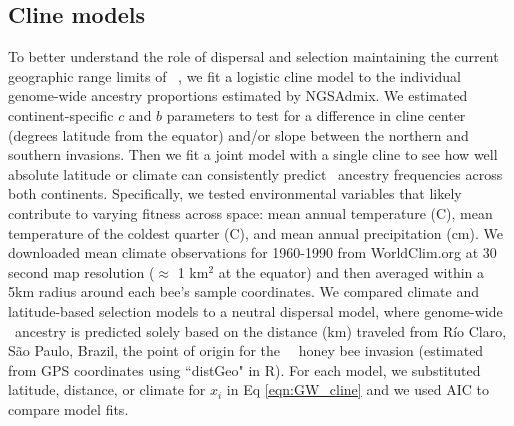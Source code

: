 \subsection*{Cline models}
To better understand the role of dispersal and selection maintaining the current geographic range limits of \scutellata\ \anc, we fit a logistic cline model to the individual genome-wide ancestry proportions estimated by NGSAdmix. We estimated continent-specific $c$ and $b$ parameters to test for a difference in cline center (degrees latitude from the equator) and/or slope between the northern and southern invasions. Then we fit a joint model with a single cline to see how well absolute latitude or climate can consistently predict \A\ ancestry frequencies across both continents. Specifically, we tested  environmental variables that likely contribute to varying fitness across space: mean annual temperature (\degree C), mean temperature of the coldest quarter (\degree C),  and mean annual precipitation (cm). We downloaded mean climate observations for 1960-1990 \cite{Hijmans:2005ke} from WorldClim.org at 30 second map resolution ($\approx$ 1 km$^{2}$ at the equator) and then averaged within a 5km radius around each bee's sample coordinates. We compared climate and latitude-based selection models to a neutral dispersal model, where genome-wide \A\ ancestry is predicted solely based on the distance (km) traveled from Río Claro, São Paulo, Brazil, the point of origin for the \africanized\ \hyb\ honey bee invasion (estimated from GPS coordinates using “distGeo" in R). For each model, we substituted latitude, distance, or climate for $x_i$ in Eq \ref{eqn:GW_cline} and we used AIC to compare model fits.

